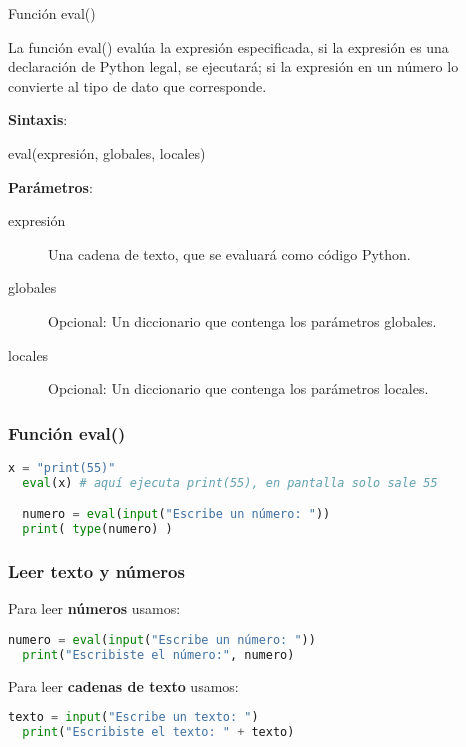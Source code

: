 \begin{frame}[c]{Función eval()}

  La función \textcolor{codeKeyword}{eval}() evalúa la expresión
  especificada, si la expresión es una declaración de Python legal,
  se ejecutará; si la expresión en un número lo convierte al tipo de
  dato que corresponde.

  \vspace{\baselineskip}
  \textbf{Sintaxis}:

  \vspace{\baselineskip}
  \textcolor{codeKeyword}{eval}(expresión, globales, locales)

  \vspace{\baselineskip}
  \textbf{Parámetros}:
  \begin{description}
    \item[expresión] Una cadena de texto, que se evaluará como código
      Python.
    \item[globales] Opcional: Un diccionario que contenga los parámetros
      globales.
    \item[locales] Opcional: Un diccionario que contenga los parámetros
      locales.
  \end{description}
\end{frame}

\begin{frame}[fragile]
  \frametitle{Función eval()}

  \begin{lstlisting}[language=Python]
  x = "print(55)"
  eval(x) # aquí ejecuta print(55), en pantalla solo sale 55

  numero = eval(input("Escribe un número: "))
  print( type(numero) )
  \end{lstlisting}
\end{frame}


\begin{frame}[fragile]
  \frametitle{Leer texto y números}

  Para leer \textbf{números} usamos:
  \begin{lstlisting}[language=Python]
  numero = eval(input("Escribe un número: "))
  print("Escribiste el número:", numero)
  \end{lstlisting}

  \vspace{\baselineskip}
  Para leer \textbf{cadenas de texto} usamos:
  \begin{lstlisting}[language=Python]
  texto = input("Escribe un texto: ")
  print("Escribiste el texto: " + texto)
  \end{lstlisting}

\end{frame}

